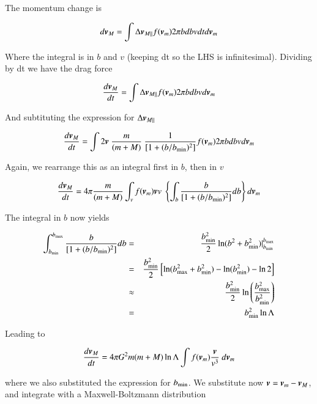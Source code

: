The momentum change is

\begin{equation}
d{\boldsymbol{v}}_M = \int \Delta{\boldsymbol{v}}_{M{||}}f({\boldsymbol{v}}_m) 2\pi b db  v dt  d{\boldsymbol{v}}_m 
\end{equation}

Where the integral is in $b$ and $v$ (keeping dt so the LHS is infinitesimal). Dividing by dt we have the drag force 

\begin{equation}
\frac{d{\boldsymbol{v}}_M}{dt} = \int \Delta{\boldsymbol{v}}_{M{||}}f({\boldsymbol{v}}_m) 2\pi b db  v  d{\boldsymbol{v}}_m 
\end{equation}

And subtituting the expression for $\Delta{\boldsymbol{v}}_{M{||}}$

\begin{equation}
\frac{d\v{v}_M}{dt} = \int 2\v{v} \ \frac{m}{(m+M)} \ \frac{1}{[1+(b/b_{\rm min})^2]} f(\v{v}_m) 2\pi b db  v  d\v{v}_m 
\end{equation}

Again, we rearrange this as an integral first in $b$, then in $v$

\begin{equation}
\frac{d\v{v}_M}{dt} = 4\pi\frac{m}{(m+M)} \int_v f(\v{v}_m) \v{v} v  \ \left\{\int_b  \frac{b}{[1+(b/b_{\rm min})^2]}  db \right\}  d\v{v}_m 
\end{equation}

The integral in $b$ now yields 

\begin{eqnarray}
\int_{b_{\rm min}}^{b_{\rm max}}  \frac{b}{[1+(b/b_{\rm min})^2]} db &=& \frac{b_{\rm min}^2}{2} \ln(b^2 +b_{\rm min}^2)\vert_{b_{\rm min}}^{b_{\rm max}}\\
&=& \frac{b_{\rm min}^2}{2} \left[\ln(b_{\rm max}^2 +b_{\rm min}^2) - \ln(b_{\rm min}^2) -\ln 2 \right]\\
&\approx& \frac{b_{\rm min}^2}{2} \ln\left(\frac{b_{\rm max}^2}{b_{\rm min}^2}\right)\\
&=& b_{\rm min}^2 \ln\Lambda\\
\end{eqnarray}

Leading to 

\begin{equation}
\frac{d{\boldsymbol{v}}_M}{dt} = 4\pi G^2 m (m+M) \ln\Lambda \int f({\boldsymbol{v}}_m) \frac{{\boldsymbol{v}}}{v^3}  \  d{\boldsymbol{v}}_m 
\end{equation}

where we also substituted the expression for $b_{\rm min}$. We substitute now ${\boldsymbol{v}} = {\boldsymbol{v}}_m - {\boldsymbol{v}}_M$, and integrate with a Maxwell-Boltzmann distribution

